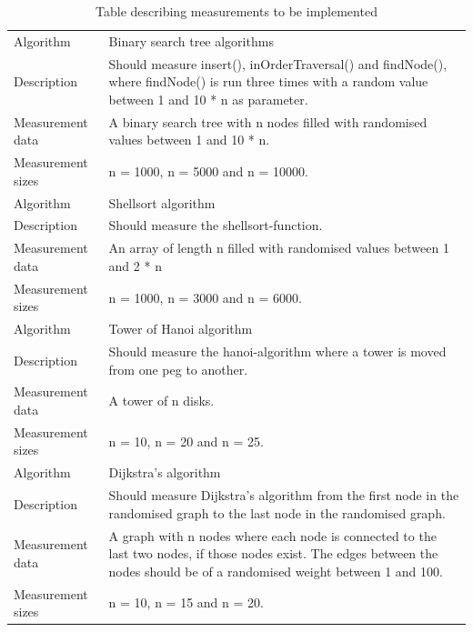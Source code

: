 \documentclass {article}
\begin{document}
\begin{table}[H]
\begin{tabular}{ | l p{10cm} | }
\hline
Algorithm & Binary search tree algorithms \\
Description & Should measure insert(), inOrderTraversal() and findNode(), where findNode() is run three times with a random value between 1 and 10 * n as parameter. \\
Measurement data & A binary search tree with n nodes filled with randomised values between 1 and 10 * n. \\ 
Measurement sizes & n = 1000, n = 5000 and n = 10000. \\
\hline
Algorithm & Shellsort algorithm \\
Description & Should measure the shellsort-function.\\
Measurement data & An array of length n filled with randomised values between 1 and 2 * n \\ 
Measurement sizes & n = 1000, n = 3000 and n = 6000. \\
\hline
Algorithm & Tower of Hanoi algorithm \\
Description & Should measure the hanoi-algorithm where a tower is moved from one peg to another. \\
Measurement data & A tower of n disks. \\ 
Measurement sizes & n = 10, n = 20 and n = 25. \\
\hline
Algorithm & Dijkstra's algorithm \\
Description & Should measure Dijkstra's algorithm from the first node in the randomised graph to the last node in the randomised graph.\\
Measurement data & A graph with n nodes where each node is connected to the last two nodes, if those nodes exist. The edges between the nodes should be of a randomised weight between 1 and 100.\\ 
Measurement sizes & n = 10, n = 15 and n = 20. \\
\hline
\end{tabular}
\caption{Table describing measurements to be implemented}
\label{tab:measurements}
\end{table}
\end{document}
